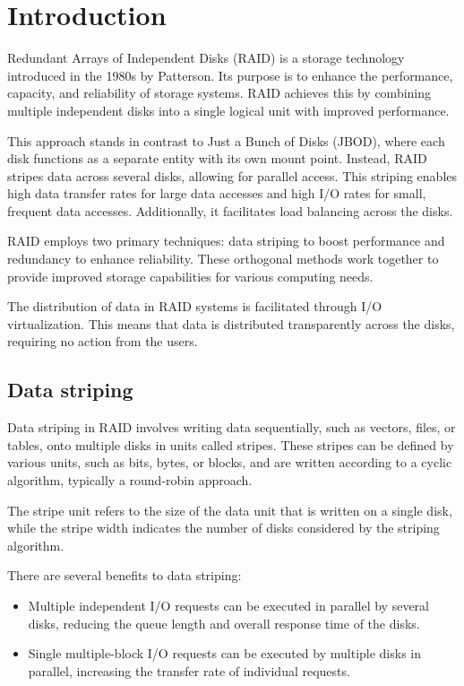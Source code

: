 \section{Introduction}

Redundant Arrays of Independent Disks (RAID) is a storage technology introduced in the 1980s by Patterson. 
Its purpose is to enhance the performance, capacity, and reliability of storage systems. 
RAID achieves this by combining multiple independent disks into a single logical unit with improved performance.

This approach stands in contrast to Just a Bunch of Disks (JBOD), where each disk functions as a separate entity with its own mount point.
Instead, RAID stripes data across several disks, allowing for parallel access. 
This striping enables high data transfer rates for large data accesses and high I/O rates for small, frequent data accesses.
Additionally, it facilitates load balancing across the disks.

RAID employs two primary techniques: data striping to boost performance and redundancy to enhance reliability. 
These orthogonal methods work together to provide improved storage capabilities for various computing needs.

The distribution of data in RAID systems is facilitated through I/O virtualization.
This means that data is distributed transparently across the disks, requiring no action from the users. 

\subsection{Data striping}
Data striping in RAID involves writing data sequentially, such as vectors, files, or tables, onto multiple disks in units called stripes. 
These stripes can be defined by various units, such as bits, bytes, or blocks, and are written according to a cyclic algorithm, typically a round-robin approach.

The stripe unit refers to the size of the data unit that is written on a single disk, while the stripe width indicates the number of disks considered by the striping algorithm.

There are several benefits to data striping:
\begin{itemize}
    \item Multiple independent I/O requests can be executed in parallel by several disks, reducing the queue length and overall response time of the disks.
    \item Single multiple-block I/O requests can be executed by multiple disks in parallel, increasing the transfer rate of individual requests.
\end{itemize}

